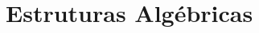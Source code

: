 \documentclass[../../main]{subfiles}
\begin{document}
    \section{Estruturas Algébricas}\label{section:estruturas-algebricas}

    

    

    

    

    

    
\end{document}
